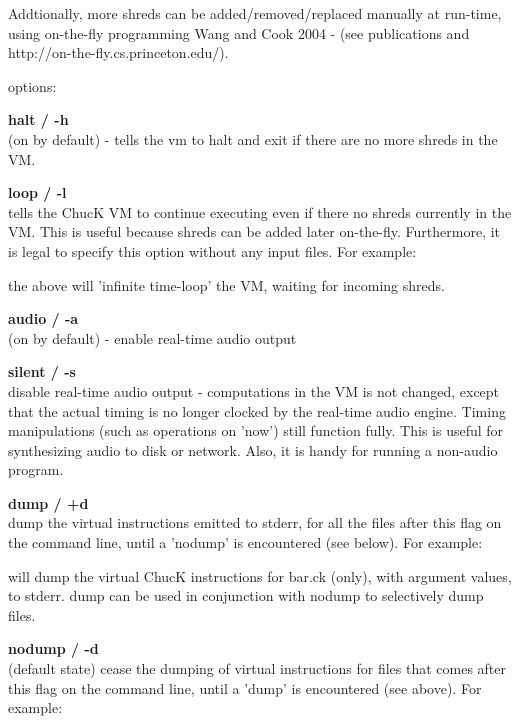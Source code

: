 Addtionally, more shreds can be added/removed/replaced manually at run-time, using on-the-fly programming \myleft Wang and Cook 2004 \myright - (see publications and http://on-the-fly.cs.princeton.edu/). 


\myleft options\myright: 

{\bf \doubledash halt / -h}\\
(on by default) - tells the vm to halt and exit if there are no more shreds in the VM. 

{\bf \doubledash loop / -l}\\
tells the ChucK VM to continue executing even if there no shreds currently in the VM. This is useful because shreds can be added later on-the-fly. Furthermore, it is legal to specify this option without any input files. For example: 


the above will 'infinite time-loop' the VM, waiting for incoming shreds. 

{\bf \doubledash audio / -a}\\
(on by default) - enable real-time audio output 

{\bf \doubledash silent / -s}\\
disable real-time audio output - computations in the VM is not changed, except that the actual timing is no longer clocked by the real-time audio engine. Timing manipulations (such as operations on 'now') still function fully. This is useful for synthesizing audio to disk or network. Also, it is handy for running a non-audio program. 

{\bf \doubledash dump / +d}\\
dump the virtual instructions emitted to stderr, for all the files after this flag on the command line, until a 'nodump' is encountered (see below). For example: 


will dump the virtual ChucK instructions for bar.ck (only), with argument values, to stderr. \doubledash dump can be used in conjunction with \doubledash nodump to selectively dump files. 

{\bf \doubledash nodump / -d}\\
(default state) cease the dumping of virtual instructions for files that comes after this flag on the command line, until a 'dump' is encountered (see above). For example: 


